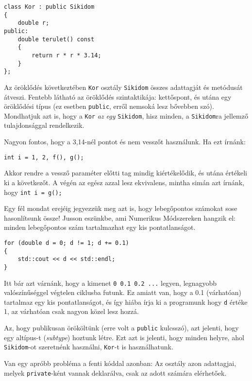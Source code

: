 \documentclass[a4paper,11.5pt]{article}
\begin{document}
	\begin{lstlisting}
class Kor : public Sikidom
{
	double r;
public:
	double terulet() const
	{
		return r * r * 3.14;
	}
};
	\end{lstlisting}
	Az öröklődés következtében \texttt{Kor} osztály \texttt{Sikidom} összes adattagját és metódusát átveszi. Fentebb látható az öröklődés szintaktikája: kettőspont, és utána egy öröklődési típus (ez esetben \texttt{public}, erről nemsoká lesz bővebben szó). Mondhatjuk azt is, hogy a \texttt{Kor} \textit{az egy} \texttt{Sikidom}, hisz minden, a \texttt{Sikidom}ra jellemző tulajdonsággal rendelkezik.
	\begin{note}
		Nagyon fontos, hogy a 3,14-nél pontot és nem vesszőt használunk. Ha ezt írnánk:
		\begin{lstlisting}
int i = 1, 2, f(), g();
		\end{lstlisting}
		
		Akkor rendre a vessző paraméter előtti tag mindig kiértékelődik, és utána értékeli ki a következőt. A végén az egész azzal lesz ekvivalens, mintha simán azt írnánk, hogy \texttt{int i = g();}
		
		Egy fél mondat erejéig jegyezzük meg azt is, hogy lebegőpontos számokat sose hasonlítsunk össze! Jusson eszünkbe, ami Numerikus Módszereken hangzik el: minden lebegőpontos szám tartalmazhat egy kis pontatlanságot.
		\begin{lstlisting}
for (double d = 0; d != 1; d += 0.1)
{
	std::cout << d << std::endl;
}
		\end{lstlisting}
		Itt bár azt várnánk, hogy a kimenet \texttt{0 0.1 0.2 ...} legyen, legnagyobb valószínűséggel végtelen ciklusba futunk. Ez amiatt van, hogy a 0.1 (várhatóan) tartalmaz egy kis pontatlanságot, és így hiába írja ki  a programunk hogy \texttt{d} értéke 1, az várhatóan csak nagyon közel lesz hozzá.
	\end{note}
	Az, hogy publikusan örököltünk (erre volt a \texttt{public} kulcsszó), azt jelenti, hogy egy {altípus}-t (\textit{subtype}) hoztunk létre. 
	Ezt azt is jelenti, hogy minden helyre, ahol \texttt{Sikidom}-ot szeretnénk használni, \texttt{Kor}-t is használhatunk.
	
	Van egy apróbb probléma a fenti kóddal azonban: Az osztály azon adattagjai, melyek \texttt{private}-ként vannak deklarálva, csak az adott számára elérhetőek.
	
\end{document}
